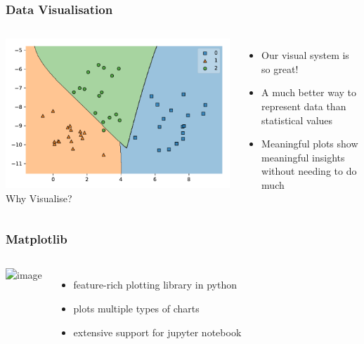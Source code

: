 \documentclass[aspectratio=169]{beamer}
\begin{document}
\begin{frame}
    \frametitle{Data Visualisation}
    \begin{columns}
            \includegraphics[width=\textwidth]{images/svm-db.pdf}
            {\large {} Why Visualise?}
            \begin{itemize}[<+(3)->]
                \item Our visual system is so great!
                \item A much better way to represent data than statistical values
                \item Meaningful plots show meaningful insights without needing to do much
            \end{itemize}
    \end{columns}
\end{frame}

\begin{frame}
    \frametitle{Matplotlib}
    \begin{columns}
            \includegraphics<2->[width=\columnwidth]{images/matplotlib-logo.png}
            \begin{itemize}[<+(2)->]
                \item feature-rich plotting library in python
                \item plots multiple types of charts
                \item extensive support for jupyter notebook
            \end{itemize}
    \end{columns}
\end{frame}
\end{document}
